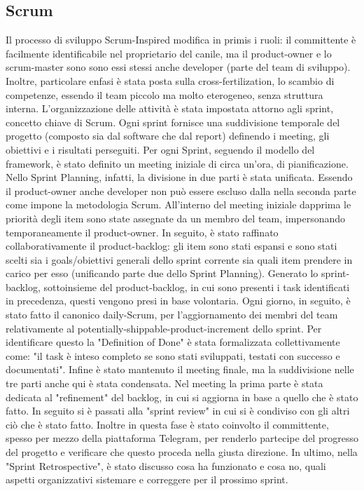     \subsection{Scrum}
    Il processo di sviluppo Scrum-Inspired modifica in primis i ruoli: il committente è facilmente identificabile nel proprietario del canile, ma il product-owner e lo scrum-master sono sono essi stessi anche developer (parte del team di sviluppo). 
    Inoltre, particolare enfasi è stata posta sulla cross-fertilization, lo scambio di competenze, essendo il team piccolo ma molto eterogeneo, senza struttura interna.
    L'organizzazione delle attività è stata impostata attorno agli sprint, concetto chiave di Scrum. Ogni sprint fornisce una suddivisione temporale del progetto (composto sia dal software che dal report) definendo i meeting, gli obiettivi e i risultati perseguiti. Per ogni Sprint, seguendo il modello del framework, è stato definito un meeting iniziale di circa un'ora, di pianificazione. 
    Nello Sprint Planning, infatti, la divisione in due parti è stata unificata. Essendo il product-owner anche developer non può essere escluso dalla nella seconda parte come impone la metodologia Scrum. 
    All'interno del meeting iniziale dapprima le priorità degli item sono state assegnate da un membro del team, impersonando temporaneamente il product-owner. In seguito, è stato raffinato collaborativamente il product-backlog: gli item sono stati espansi e sono stati scelti sia i goals/obiettivi generali dello sprint corrente sia quali item prendere in carico per esso (unificando parte due dello Sprint Planning).
    Generato lo sprint-backlog, sottoinsieme del product-backlog, in cui sono presenti i task identificati in precedenza, questi vengono presi in base volontaria. 
    Ogni giorno, in seguito, è stato fatto il canonico daily-Scrum, per l'aggiornamento dei membri del team relativamente al potentially-shippable-product-increment dello sprint.
    Per identificare questo la "Definition of Done" è stata formalizzata collettivamente come: "il task è inteso completo se sono stati sviluppati, testati con successo e documentati".
    Infine è stato mantenuto il meeting finale, ma la suddivisione nelle tre parti anche qui è stata condensata. 
    Nel meeting la prima parte è stata dedicata al "refinement" del backlog, in cui si aggiorna in base a quello che è stato fatto. In seguito si è passati alla "sprint review" in cui si è condiviso con gli altri ciò che è stato fatto. Inoltre in questa fase è stato coinvolto il committente, spesso per mezzo della piattaforma Telegram, per renderlo partecipe del progresso del progetto e verificare che questo proceda nella giusta direzione. In ultimo, nella "Sprint Retrospective", è stato discusso cosa ha funzionato e cosa no, quali aspetti organizzativi sistemare e correggere per il prossimo sprint. 
    
